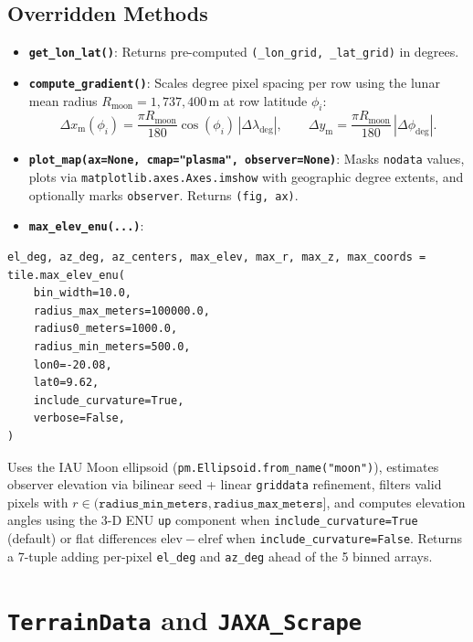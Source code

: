\documentclass[11pt,letterpaper]{article}
\begin{document}
\subsection{Overridden Methods}
\begin{itemize}
  \item \textbf{\texttt{get\_lon\_lat()}}: Returns pre-computed \texttt{(\_lon\_grid, \_lat\_grid)} in degrees.
  \item \textbf{\texttt{compute\_gradient()}}: Scales degree pixel spacing per row using the lunar mean radius $R_{\text{moon}} = 1{,}737{,}400\,\text{m}$ at row latitude $\phi_i$:
  \begin{equation}
    \Delta x_{\mathrm{m}}(\phi_i) = \frac{\pi R_{\text{moon}}}{180} \cos(\phi_i) \, |\Delta\lambda_{\mathrm{deg}}|, \qquad
    \Delta y_{\mathrm{m}} = \frac{\pi R_{\text{moon}}}{180} \, |\Delta\phi_{\mathrm{deg}}|.
  \end{equation}
  \item \textbf{\texttt{plot\_map(ax=None, cmap="plasma", observer=None)}}: Masks \texttt{nodata} values, plots via \texttt{matplotlib.axes.Axes.imshow} with geographic degree extents, and optionally marks \texttt{observer}. Returns \texttt{(fig, ax)}.
  \item \textbf{\texttt{max\_elev\_enu(...)}}:
\end{itemize}
\begin{lstlisting}
el_deg, az_deg, az_centers, max_elev, max_r, max_z, max_coords = tile.max_elev_enu(
    bin_width=10.0,
    radius_max_meters=100000.0,
    radius0_meters=1000.0,
    radius_min_meters=500.0,
    lon0=-20.08,
    lat0=9.62,
    include_curvature=True,
    verbose=False,
)
\end{lstlisting}
Uses the IAU Moon ellipsoid (\texttt{pm.Ellipsoid.from\_name("moon")}), estimates observer elevation via bilinear seed + linear \texttt{griddata} refinement, filters valid pixels with $r \in (\texttt{radius\_min\_meters}, \texttt{radius\_max\_meters}]$, and computes elevation angles using the 3-D ENU \texttt{up} component when \texttt{include\_curvature=True} (default) or flat differences $\mathrm{elev} - \mathrm{elref}$ when \texttt{include\_curvature=False}. Returns a 7-tuple adding per-pixel \texttt{el\_deg} and \texttt{az\_deg} ahead of the 5 binned arrays.

\section{\texttt{TerrainData} and \texttt{JAXA\_Scrape}}
\end{document}
